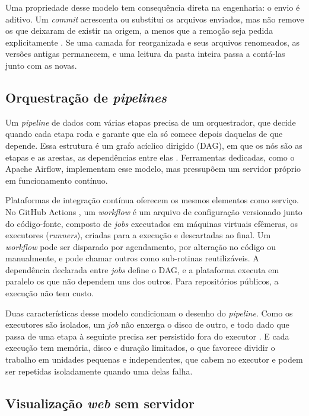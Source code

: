 Uma propriedade desse modelo tem consequência direta na engenharia: o envio é aditivo. Um \textit{commit} acrescenta ou substitui os arquivos enviados, mas não remove os que deixaram de existir na origem, a menos que a remoção seja pedida explicitamente \cite{HuggingFaceUpload2026}. Se uma camada for reorganizada e seus arquivos renomeados, as versões antigas permanecem, e uma leitura da pasta inteira passa a contá-las junto com as novas.

\subsection{Orquestração de \textit{pipelines}}
\label{subsec:orquestracao}

Um \textit{pipeline} de dados com várias etapas precisa de um orquestrador, que decide quando cada etapa roda e garante que ela só comece depois daquelas de que depende. Essa estrutura é um grafo acíclico dirigido (DAG), em que os nós são as etapas e as arestas, as dependências entre elas \cite{Reis2022}. Ferramentas dedicadas, como o Apache Airflow, implementam esse modelo, mas pressupõem um servidor próprio em funcionamento contínuo.

Plataformas de integração contínua oferecem os mesmos elementos como serviço. No GitHub Actions \cite{GitHubActions2026}, um \textit{workflow} é um arquivo de configuração versionado junto do código-fonte, composto de \textit{jobs} executados em máquinas virtuais efêmeras, os executores (\textit{runners}), criadas para a execução e descartadas ao final. Um \textit{workflow} pode ser disparado por agendamento, por alteração no código ou manualmente, e pode chamar outros como sub-rotinas reutilizáveis. A dependência declarada entre \textit{jobs} define o DAG, e a plataforma executa em paralelo os que não dependem uns dos outros. Para repositórios públicos, a execução não tem custo.

Duas características desse modelo condicionam o desenho do \textit{pipeline}. Como os executores são isolados, um \textit{job} não enxerga o disco de outro, e todo dado que passa de uma etapa à seguinte precisa ser persistido fora do executor \cite{GitHubActions2026}. E cada execução tem memória, disco e duração limitados, o que favorece dividir o trabalho em unidades pequenas e independentes, que cabem no executor e podem ser repetidas isoladamente quando uma delas falha.

\subsection{Visualização \textit{web} sem servidor}
\label{sec:visualizacao}

